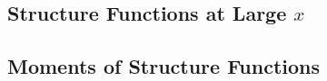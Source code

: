 \subsection{Structure Functions at Large $x$}

\subsection{Moments of Structure Functions}










